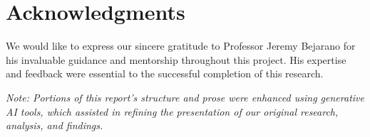 \documentclass{article}
\begin{document}
\vspace{1cm}
\section*{Acknowledgments}
We would like to express our sincere gratitude to Professor Jeremy Bejarano for his invaluable guidance and mentorship throughout this project. His expertise and feedback were essential to the successful completion of this research.

\vspace{0.3cm}
\noindent
\textit{Note: Portions of this report's structure and prose were enhanced using generative AI tools, which assisted in refining the presentation of our original research, analysis, and findings.}
\end{document}
